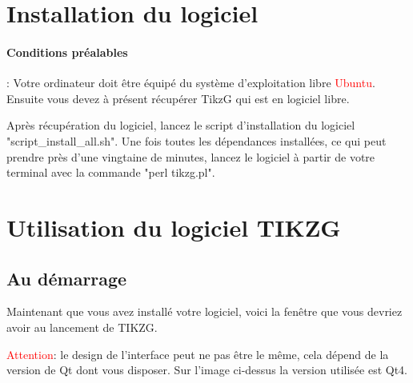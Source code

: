 \documentclass[a4paper]{report}
\begin{document}
\tableofcontents
 \newpage
\section{Installation du logiciel}
\paragraph{Conditions préalables}:
Votre ordinateur doit être équipé du système d'exploitation libre \textcolor{red}{Ubuntu}. Ensuite vous devez à présent récupérer TikzG qui est en logiciel libre.

Après récupération du logiciel, lancez le script d'installation du logiciel "script\_install\_all.sh". Une fois toutes les dépendances installées, ce qui peut prendre près d'une vingtaine de minutes, lancez le logiciel à partir de votre terminal avec la commande "perl tikzg.pl".


\section{Utilisation du logiciel TIKZG}
\subsection{Au démarrage}
Maintenant que vous avez installé votre logiciel, voici la fenêtre que vous devriez avoir au lancement de TIKZG.
\begin{center} \end{center}
\textcolor{red}{Attention}: le design de l'interface peut ne pas être le même, cela dépend de la version de Qt dont vous disposer. Sur l'image ci-dessus la version utilisée est Qt4.
\end{document}
